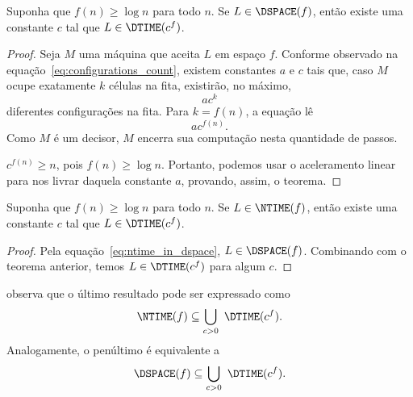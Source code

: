 \begin{theorem}
    Suponha que $f(n) \geq \log n$ para todo $n$.
    Se $L \in \DSPACE(f)$,
    então existe uma constante $c$
    tal que $L \in \DTIME(c^f)$.
    \label{tmh:dspace_in_dtime}
\end{theorem}

\begin{proof}
    Seja $M$ uma máquina que aceita $L$ em espaço $f$.
    Conforme observado na equação~\ref{eq:configurations_count},
    existem constantes $a$ e $c$ tais que,
    caso $M$ ocupe exatamente $k$ células na fita,
    existirão, no máximo,
    \begin{equation*}
        ac^k
    \end{equation*}
    diferentes configurações na fita.
    Para $k = f(n)$, a equação lê
    \begin{equation*}
        ac^{f(n)}.
    \end{equation*}
    Como $M$ é um decisor,
    $M$ encerra sua computação nesta quantidade de passos.

    $c^{f(n)} \geq n$, pois $f(n) \geq \log n$.
    Portanto, podemos usar o aceleramento linear
    para nos livrar daquela constante $a$,
    provando, assim, o teorema.
\end{proof}

\begin{theorem}
    Suponha que $f(n) \geq \log n$ para todo $n$.
    Se $L \in \NTIME(f)$,
    então existe uma constante $c$
    tal que $L \in \DTIME(c^f)$.
\end{theorem}

\begin{proof}
    Pela equação~\ref{eq:ntime_in_dspace},
    $L \in \DSPACE(f)$.
    Combinando com o teorema anterior,
    temos $L \in \DTIME(c^f)$ para algum $c$.
\end{proof}

 observa que
o último resultado pode ser expressado como
\begin{equation*}
    \NTIME(f) \subseteq \bigcup_{c > 0} \ \DTIME(c^f).
\end{equation*}
Analogamente, o penúltimo é equivalente a
\begin{equation*}
    \DSPACE(f) \subseteq \bigcup_{c > 0} \ \DTIME(c^f).
\end{equation*}
